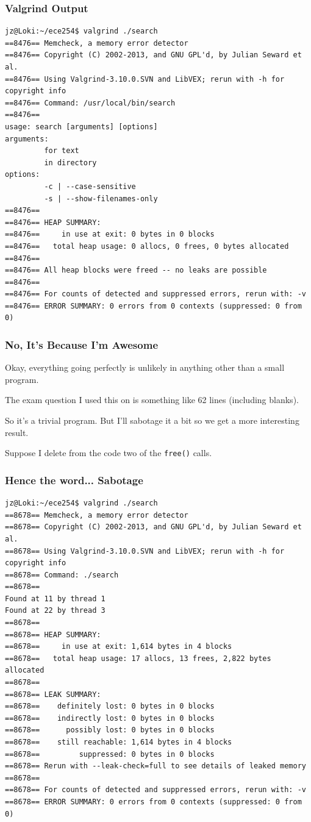\begin{frame}[fragile]
\frametitle{Valgrind Output}
{\scriptsize
\begin{verbatim}
jz@Loki:~/ece254$ valgrind ./search
==8476== Memcheck, a memory error detector
==8476== Copyright (C) 2002-2013, and GNU GPL'd, by Julian Seward et al.
==8476== Using Valgrind-3.10.0.SVN and LibVEX; rerun with -h for copyright info
==8476== Command: /usr/local/bin/search
==8476== 
usage: search [arguments] [options]
arguments:
         for text
         in directory
options:
         -c | --case-sensitive
         -s | --show-filenames-only
==8476== 
==8476== HEAP SUMMARY:
==8476==     in use at exit: 0 bytes in 0 blocks
==8476==   total heap usage: 0 allocs, 0 frees, 0 bytes allocated
==8476== 
==8476== All heap blocks were freed -- no leaks are possible
==8476== 
==8476== For counts of detected and suppressed errors, rerun with: -v
==8476== ERROR SUMMARY: 0 errors from 0 contexts (suppressed: 0 from 0)
\end{verbatim}
}

\end{frame}

\begin{frame}
\frametitle{No, It's Because I'm Awesome}

Okay, everything going perfectly is unlikely in anything other than a small program. 

The exam question I used this on is something like 62 lines (including blanks). 

So it's a trivial program. But I'll sabotage it a bit so we get a more interesting result. 

Suppose I delete from the code two of the \texttt{free()} calls.

\end{frame}

\begin{frame}[fragile]
\frametitle{Hence the word... Sabotage}
{\scriptsize
\begin{verbatim}
jz@Loki:~/ece254$ valgrind ./search 
==8678== Memcheck, a memory error detector
==8678== Copyright (C) 2002-2013, and GNU GPL'd, by Julian Seward et al.
==8678== Using Valgrind-3.10.0.SVN and LibVEX; rerun with -h for copyright info
==8678== Command: ./search
==8678== 
Found at 11 by thread 1 
Found at 22 by thread 3 
==8678== 
==8678== HEAP SUMMARY:
==8678==     in use at exit: 1,614 bytes in 4 blocks
==8678==   total heap usage: 17 allocs, 13 frees, 2,822 bytes allocated
==8678== 
==8678== LEAK SUMMARY:
==8678==    definitely lost: 0 bytes in 0 blocks
==8678==    indirectly lost: 0 bytes in 0 blocks
==8678==      possibly lost: 0 bytes in 0 blocks
==8678==    still reachable: 1,614 bytes in 4 blocks
==8678==         suppressed: 0 bytes in 0 blocks
==8678== Rerun with --leak-check=full to see details of leaked memory
==8678== 
==8678== For counts of detected and suppressed errors, rerun with: -v
==8678== ERROR SUMMARY: 0 errors from 0 contexts (suppressed: 0 from 0)
\end{verbatim}
}

\end{frame}


